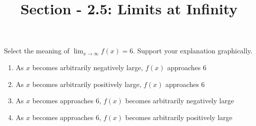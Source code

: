 \documentclass[nooutcomes]{ximera}
\title{Section - 2.5:  Limits at Infinity}
\begin{document}
\begin{abstract}		\end{abstract}
\maketitle

\begin{problem}
	Select the meaning of $\lim_{x \to \infty} f(x)=6$.  Support your explanation graphically.

	\begin{enumerate}
	\item As $x$ becomes arbitrarily negatively large, $f(x)$ approaches $6$
	\item As $x$ becomes arbitrarily positively large, $f(x)$ approaches $6$
	\item As $x$ becomes approaches 6, $f(x)$ becomes arbitrarily negatively large
	\item As $x$ becomes approaches 6, $f(x)$ becomes arbitrarily positively large
	\end{enumerate}


\end{problem}
\end{document}
